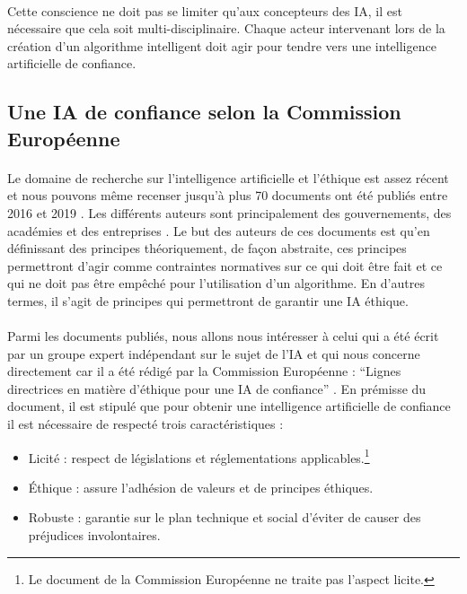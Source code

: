 \documentclass[10pt, french, a4paper]{report}
\begin{document}
\paragraph{}
Cette conscience ne doit pas se limiter qu’aux concepteurs des IA, il est nécessaire que cela soit multi-disciplinaire. Chaque acteur intervenant lors de la création d'un algorithme intelligent doit agir pour tendre vers une intelligence artificielle de confiance.

\subsection{Une IA de confiance selon la Commission Européenne}

\paragraph{}
Le domaine de recherche sur l'intelligence artificielle et l'éthique est assez récent et nous pouvons même recenser jusqu'à plus 70 documents ont été publiés entre 2016 et 2019 \citep{algorithm_watch_ai_2020}. Les différents auteurs sont principalement des gouvernements, des académies et des entreprises \citep{morley_what_2019}. Le but des auteurs de ces documents est qu'en définissant des principes théoriquement, de façon abstraite, ces principes permettront d'agir comme contraintes normatives \citep{turilli_ethical_2007} sur ce qui doit être fait et ce qui ne doit pas être empêché pour l'utilisation d'un algorithme. En d'autres termes, il s'agit de principes qui permettront de garantir une IA éthique.

\paragraph{}
Parmi les documents publiés, nous allons nous intéresser à celui qui a été écrit par un groupe expert indépendant sur le sujet de l'IA et qui nous concerne directement car il a été rédigé par la Commission Européenne : ``Lignes directrices en matière d'éthique pour une IA de confiance'' \citep{commission_europeenne_ethics_2019}. En prémisse du document, il est stipulé que pour obtenir une intelligence artificielle de confiance il est nécessaire de respecté trois caractéristiques : 

\begin{itemize}
  \item Licité : respect de législations et réglementations applicables.\footnote{Le document de la Commission Européenne ne traite pas l'aspect licite.}
  \item \uppercase{é}thique : assure l'adhésion de valeurs et de principes éthiques.
  \item Robuste : garantie sur le plan technique et social d'éviter de causer des préjudices involontaires.
\end{itemize}
\end{document}
